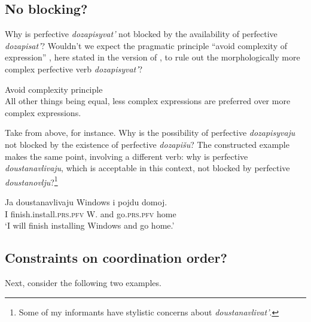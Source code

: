 \documentclass[output=paper,
colorlinks,
citecolor=brown,
newtxmath
]{langscibook}
\begin{document}

\subsection{No blocking?}

Why is perfective \textit{dozapisyvat'} not blocked by the availability of perfective \textit{dozapisat'}? Wouldn't we expect the pragmatic principle ``avoid complexity of expression'' \citep{Kiparsky2005}, here stated in the version of \citet{LeBruyn2007}, to rule out the morphologically more complex perfective verb \textit{dozapisyvat'}?

\ea\label{avoid} Avoid complexity principle\\All other things being equal, less complex expressions are preferred over more complex expressions.
\z

\noindent Take  from above, for instance. Why is the possibility of perfective \textit{dozapisyvaju} not blocked by the existence of perfective \textit{dozapišu}? The constructed example  makes the same point, involving a different verb: why is perfective \textit{doustanavlivaju}, which is acceptable in this context, not blocked by perfective \textit{doustanovlju}?\footnote{\label{f1}Some of my informants have stylistic concerns about \textit{doustanavlivat'}.}

\ea\label{block1}
\gll Ja doustanavlivaju Windows i pojdu domoj.\\
I {finish.install.}\textsc{prs.pfv} W. and go.\textsc{prs.pfv} home\\
\glt `I will finish installing Windows and go home.'
\z


\subsection{Constraints on coordination order?}\label{arte}

Next, consider the following two examples.

{
\z}
\end{document}
